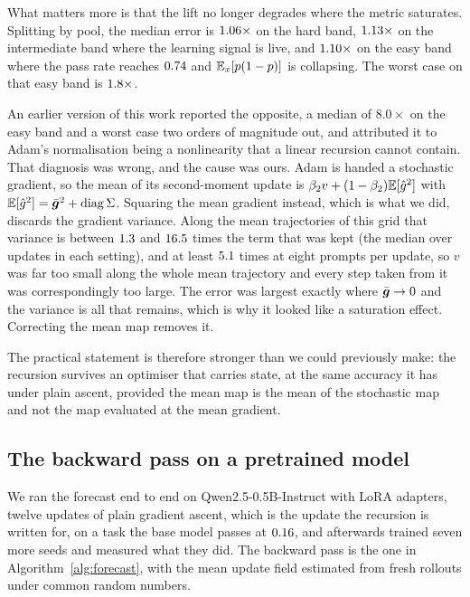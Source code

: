 What matters more is that the lift no longer degrades where the metric saturates. Splitting by
pool, the median error is $1.06\times$ on the hard band, $1.13\times$ on the intermediate band
where the learning signal is live, and $1.10\times$ on the easy band where the pass rate reaches
$0.74$ and $\mathbb{E}_x[p(1-p)]$ is collapsing. The worst case on that easy band is $1.8\times$.

An earlier version of this work reported the opposite, a median of $8.0\times$ on the easy band and
a worst case two orders of magnitude out, and attributed it to Adam's normalisation being a
nonlinearity that a linear recursion cannot contain. That diagnosis was wrong, and the cause was
ours. Adam is handed a stochastic gradient, so the mean of its second-moment update is
$\beta_2 v + (1-\beta_2)\mathbb{E}[\hat{g}^2]$ with $\mathbb{E}[\hat{g}^2] = \bar{\bm{g}}^2 + \operatorname{diag}\Sigma$.
Squaring the mean gradient instead, which is what we did, discards the gradient variance. Along
the mean trajectories of this grid that variance is between $1.3$ and
$16.5$ times the term that was kept (the median over updates in each
setting), and at least $5.1$ times at eight prompts per update, so $v$
was far too small along the whole mean trajectory and every step taken from it was correspondingly too large.
The error was largest exactly where $\bar{\bm{g}} \to 0$ and the variance is all that remains, which is
why it looked like a saturation effect. Correcting the mean map removes it.

The practical statement is therefore stronger than we could previously make: the recursion survives
an optimiser that carries state, at the same accuracy it has under plain ascent, provided the mean
map is the mean of the stochastic map and not the map evaluated at the mean gradient.

\subsection{The backward pass on a pretrained model}
\label{sec:exp-real}

We ran the forecast end to end on Qwen2.5-0.5B-Instruct with LoRA adapters, twelve updates of plain
gradient ascent, which is the update the recursion is written for, on a task the base model passes
at $0.16$, and afterwards trained seven more seeds and measured what they did. The backward pass is
the one in Algorithm~\ref{alg:forecast}, with the mean update field estimated from fresh rollouts
under common random numbers.

